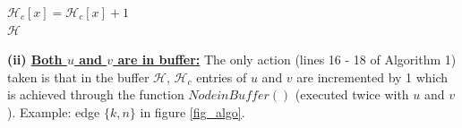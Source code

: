\begin{function2}[!ht]
\caption{\small $NodeinBuffer(u,\mathcal{H})$}
\label{nodebuffer}
$\mathcal{H}_c[x]=\mathcal{H}_c[x] + 1$\\
\Return $\mathcal{H}$
\end{function2}





\noindent\textbf{(ii) \underline{Both $u$ and $v$ are in buffer:}}
The only action (lines 16 - 18 of Algorithm 1) taken is that in the buffer $\mathcal{H}$, $\mathcal{H}_c$ entries of $u$ and $v$ are incremented by 1 which is achieved through the function $NodeinBuffer()$ (executed twice with $u$ and $v$).
Example: edge $\{k,n\}$ in figure \ref{fig_algo}.

